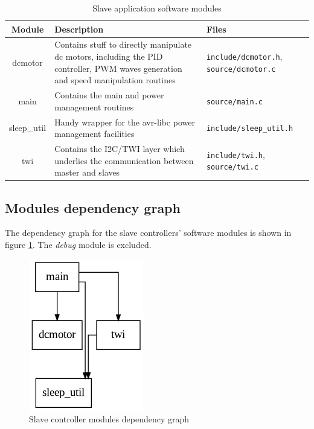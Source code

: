 \documentclass[binding=0.6cm,Lau]{sapthesis}
\begin{document}
\begin{table}[hb]
  \begin{tabularx}{\textwidth}{c X X}
    \toprule
    Module & Description & Files \\
    \midrule
    dcmotor &
      Contains stuff to directly manipulate dc motors, including the PID controller, PWM waves generation and speed manipulation routines &
      \texttt{include/dcmotor.h}, \texttt{source/dcmotor.c} \\
    main &
      Contains the main and power management routines &
      \texttt{source/main.c} \\
    sleep\_util &
      Handy wrapper for the avr-libc power management facilities &
      \texttt{include/sleep\_util.h} \\
    twi &
      Contains the I2C/TWI layer which underlies the communication between master and slaves &
      \texttt{include/twi.h}, \texttt{source/twi.c} \\
    \bottomrule
  \end{tabularx}
  \caption{Slave application software modules}
  \label{tab:slave-spec-modules}
\end{table}


\subsection{Modules dependency graph}
The dependency graph for the slave controllers' software modules is shown in
figure \ref{img:slave-deps-graph}. The \emph{debug} module is excluded.
\begin{figure}[hbp]
\begin{centering}
  \includegraphics[scale=0.5]{img/slave-deps}
  \caption{Slave controller modules dependency graph}
  \label{img:slave-deps-graph}
\end{centering}
\end{figure}
\end{document}

